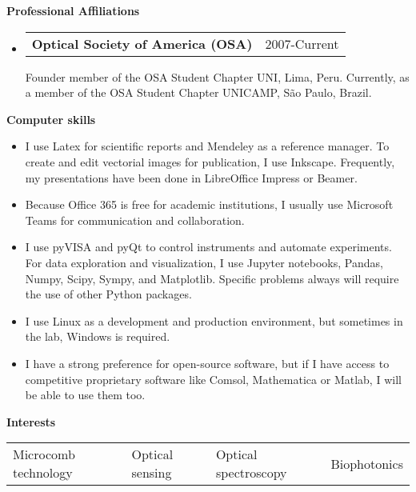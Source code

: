 \documentclass[letterpaper, 12pt]{article}[leftmargin=*]
\makeatletter
\renewcommand{\section}[2]{
  \colorbox{secondary}{\color{white}\raggedbottom\normalsize\textbf{{#1}{\hspace{7pt}#2}}}
}
\newcommand{\resumeEntryStart}{\begin{itemize}[leftmargin=2.5mm]\itemsep8pt}
\newcommand{\resumeEntryEnd}{\end{itemize}}
\newcommand{\resumeItemListStart}{\begin{itemize}[leftmargin=4.5mm]\itemsep-3pt}
\newcommand{\resumeItemListEnd}{\end{itemize}}
\newcommand{\resumeItem}[1]{
  \item\small{
    {#1}
  }
}
\newcommand{\resumeEntryTD}[2]{
  \item[]
    \begin{tabularx}{0.97\textwidth}{X@{\hspace{60pt}}r}
      \textbf{\color{primary}#1} & {\firabook\color{accent}\small#2}
    \end{tabularx}\vspace{3pt}
}
\newcommand{\resumeEntryS}[2]{
  \item[]\small{
    \textbf{\color{primary}#1 }{ #2 }
  }
}
\newcommand{\fourthcol}[4]{
	\vspace{-0.3cm}
	\begin{tabularx}{\textwidth}{XXXX}
		{\small#1} & {\small#2} & {\small#3} & {\small#4}
	\end{tabularx}
}
\makeatother
\begin{document}
\section{\faGroup}{Professional Affiliations}
\resumeEntryStart
\resumeEntryTD
{\small Optical Society of America (OSA)}{2007-Current}
\small{Founder member of the OSA Student Chapter UNI, Lima, Peru. Currently, as a member of the OSA Student Chapter UNICAMP, São Paulo, Brazil.}
\resumeEntryEnd

\section{\faDesktop}{Computer skills}
\resumeItemListStart
\resumeItem{I use Latex for scientific reports and Mendeley as a reference manager. To create and edit vectorial images for publication, I use Inkscape. Frequently, my presentations have been done in LibreOffice Impress or Beamer.}
\resumeItem{Because Office 365 is free for academic institutions, I usually use Microsoft Teams for communication and collaboration.}
\resumeItem{I use pyVISA and pyQt to control instruments and automate experiments. For data exploration and visualization, I use Jupyter notebooks, Pandas, Numpy, Scipy, Sympy, and Matplotlib. Specific problems always will require the use of other Python packages.}
\resumeItem{I use Linux as a development and production environment, but sometimes in the lab, Windows is required.}
\resumeItem{I have a strong preference for open-source software, but if I have access to competitive proprietary software like Comsol, Mathematica or Matlab, I will be able to use them too.}
\resumeItemListEnd

\section{\faThumbTack}{Interests}
\resumeEntryStart
\small
\fourthcol{\resumeEntryS{}{Microcomb technology}}{\resumeEntryS{}{Optical sensing}}{\resumeEntryS{}{Optical spectroscopy}}{\resumeEntryS{}{Biophotonics}}
\resumeEntryEnd

\end{document}
